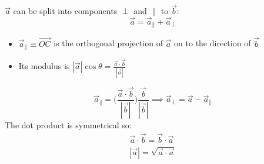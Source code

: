 \documentclass[a4paper, 11pt, normalem]{report}
\begin{document}
$\vec{a}$ can be split into components $\perp$ and $\parallel$ to $\vec{b}$:
\begin{equation*}
    \vec{a} = \vec{a}_{\parallel} + \vec{a}_{\perp}
\end{equation*}
\begin{itemize}
    \item $\vec{a}_{\parallel} \equiv \vec{OC}$ is the orthogonal projection of $\vec{a}$ on to the direction of $\vec{b}$
    \item Its modulus is $|\vec{a}|\cos\theta = \frac{\vec{a} \cdot \vec{b}}{|\vec{a}|}$
\end{itemize}
\begin{equation*}
    \vec{a}_{\parallel} = \Bigg(\frac{\vec{a} \cdot \vec{b}}{|\vec{b}|}\Bigg) \frac{\vec{b}}{|\vec{b}|} \implies \vec{a}_{\perp} = \vec{a} - \vec{a}_{\parallel}
\end{equation*}
The dot product is symmetrical so:
\begin{gather*}
    \vec{a} \cdot \vec{b} = \vec{b} \cdot \vec{a} \\
    |\vec{a}| = \sqrt{\vec{a} \cdot \vec{a}}
\end{gather*}

\newpage
\end{document}
